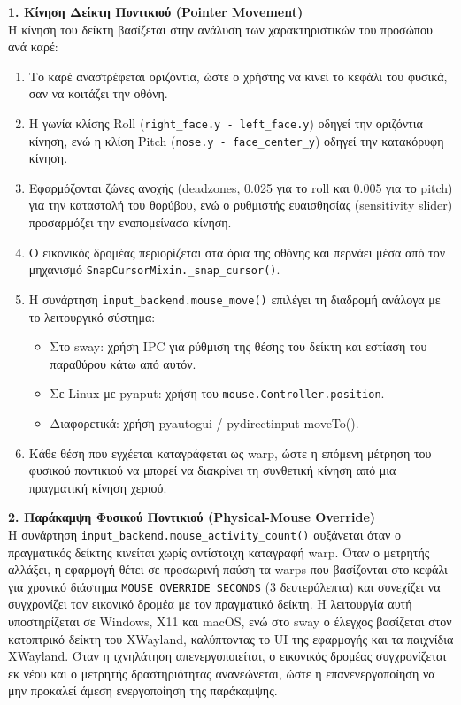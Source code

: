 \documentclass[twoside, a4paper, 11pt]{article}
\newcommand{\textlatin}[1]{\textenglish{#1}}
\begin{document}
\textbf{1. Κίνηση Δείκτη Ποντικιού (\textlatin{Pointer Movement})}\\
Η κίνηση του δείκτη βασίζεται στην ανάλυση των χαρακτηριστικών του προσώπου ανά καρέ:
\begin{enumerate}
    \item Το καρέ αναστρέφεται οριζόντια, ώστε ο χρήστης να κινεί το κεφάλι του φυσικά, σαν να κοιτάζει την οθόνη.
    \item Η γωνία κλίσης \textlatin{Roll} (\texttt{right\_face.y - left\_face.y}) οδηγεί την οριζόντια κίνηση, ενώ η κλίση \textlatin{Pitch} (\texttt{nose.y - face\_center\_y}) οδηγεί την κατακόρυφη κίνηση.
    \item Εφαρμόζονται ζώνες ανοχής (\textlatin{deadzones}, 0.025 για το \textlatin{roll} και 0.005 για το \textlatin{pitch}) για την καταστολή του θορύβου, ενώ ο ρυθμιστής ευαισθησίας (\textlatin{sensitivity slider}) προσαρμόζει την εναπομείνασα κίνηση.
    \item Ο εικονικός δρομέας περιορίζεται στα όρια της οθόνης και περνάει μέσα από τον μηχανισμό \texttt{SnapCursorMixin.\_snap\_cursor()}.
    \item Η συνάρτηση \texttt{input\_backend.mouse\_move()} επιλέγει τη διαδρομή ανάλογα με το λειτουργικό σύστημα:
    \begin{itemize}
        \item Στο \textlatin{sway}: χρήση \textlatin{IPC} για ρύθμιση της θέσης του δείκτη και εστίαση του παραθύρου κάτω από αυτόν.
        \item Σε \textlatin{Linux} με \textlatin{pynput}: χρήση του \texttt{mouse.Controller.position}.
        \item Διαφορετικά: χρήση \textlatin{pyautogui / pydirectinput moveTo()}.
    \end{itemize}
    \item Κάθε θέση που εγχέεται καταγράφεται ως \textlatin{warp}, ώστε η επόμενη μέτρηση του φυσικού ποντικιού να μπορεί να διακρίνει τη συνθετική κίνηση από μια πραγματική κίνηση χεριού.
\end{enumerate}


\textbf{2. Παράκαμψη Φυσικού Ποντικιού (\textlatin{Physical-Mouse Override})}\\
Η συνάρτηση \texttt{input\_backend.mouse\_activity\_count()} αυξάνεται όταν ο πραγματικός δείκτης κινείται χωρίς αντίστοιχη καταγραφή \textlatin{warp}. Όταν ο μετρητής αλλάξει, η εφαρμογή θέτει σε προσωρινή παύση τα \textlatin{warps} που βασίζονται στο κεφάλι για χρονικό διάστημα \texttt{MOUSE\_OVERRIDE\_SECONDS} (3 δευτερόλεπτα) και συνεχίζει να συγχρονίζει τον εικονικό δρομέα με τον πραγματικό δείκτη. Η λειτουργία αυτή υποστηρίζεται σε \textlatin{Windows, X11} και \textlatin{macOS}, ενώ στο \textlatin{sway} ο έλεγχος βασίζεται στον κατοπτρικό δείκτη του \textlatin{XWayland}, καλύπτοντας το \textlatin{UI} της εφαρμογής και τα παιχνίδια \textlatin{XWayland}. Όταν η ιχνηλάτηση απενεργοποιείται, ο εικονικός δρομέας συγχρονίζεται εκ νέου και ο μετρητής δραστηριότητας ανανεώνεται, ώστε η επανενεργοποίηση να μην προκαλεί άμεση ενεργοποίηση της παράκαμψης.
\end{document}
